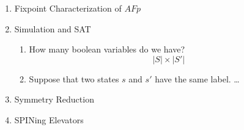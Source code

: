 \documentclass{article}
\begin{document}
\begin{enumerate}
\begin{enumerate}
  $E(GF p)$ is not equivalent to $EG(AF p)$ because the second is a stronger restriction. For example, take the Kripke structure in Figure~\ref{fig:p2b2}.  Here, there exists a path in which $q$ is always true in the future ($E(GF q)$), namely the path that switches between $a$ and $q$.  On the other hand, it is not true that $EG(AF q)$, since no matter what path we choose, there always will exist some branching path that stay forever in $a$.
\begin{figure}
  \begin{center}
    \texttt{[image: p2b2]}
  \end{center}
  \caption{Example distinguishing $E(GF p)$ from $EG(AF p)$}
  \label{fig:p2b2}
\end{figure}
\item
\begin{enumerate}
  \item These two CTL formulas are equivalent. There exist a path that has one of two properties true in the future if and only if there exists a path that has one true or the other.
  \item These are not equivalent.  A computation tree that distinguishes them is given in Figure~\ref{fig:p2c}.  Here it is not the case that either $AFp$ or $AFq$, but it is true that $AF(p \vee q)$.
\begin{figure}
  \begin{center}
    \texttt{[image: p2c]}
  \end{center}
  \caption{Example distinguishing $(AF p) \vee (AF q)$ from $AF(p \vee q)$}
  \label{fig:p2c}
\end{figure}
\end{enumerate}
  \end{enumerate}
\item Fixpoint Characterization of $AFp$
\item Simulation and SAT
  \begin{enumerate}
    \item How many boolean variables do we have?
      \[ |S| \times |S'| \]
    \item Suppose that two states $s$ and $s'$ have the same label. \dots
  \end{enumerate}
\item Symmetry Reduction
\item SPINing Elevators
\end{enumerate}

%
%
\end{document}
